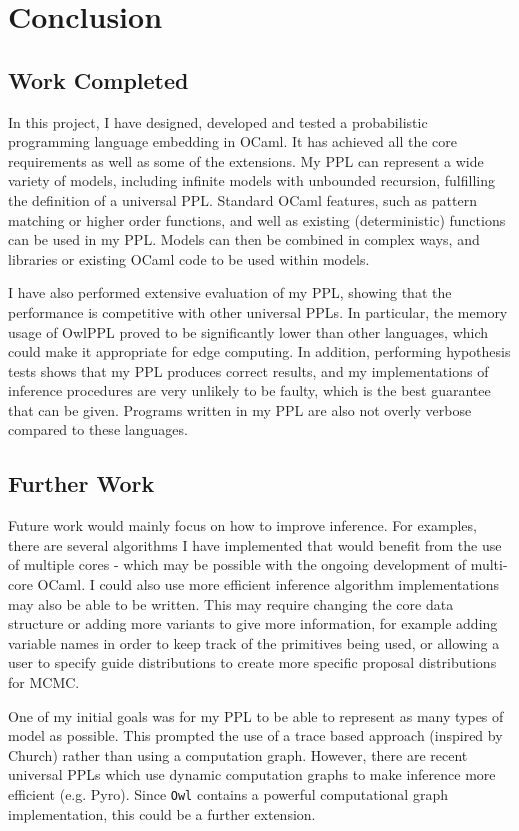 \chapter{Conclusion}

\section{Work Completed}
In this project, I have designed, developed and tested a probabilistic programming language embedding in OCaml. It has achieved all the core requirements as well as some of the extensions. My PPL can represent a wide variety of models, including infinite models with unbounded recursion, fulfilling the definition of a universal PPL. Standard OCaml features, such as pattern matching or higher order functions, and well as existing (deterministic) functions can be used in my PPL. Models can then be combined in complex ways, and libraries or existing OCaml code to be used within models.

I have also performed extensive evaluation of my PPL, showing that the performance is competitive with other universal PPLs. In particular, the memory usage of OwlPPL proved to be significantly lower than other languages, which could make it appropriate for edge computing. In addition, performing hypothesis tests shows that my PPL produces correct results, and my implementations of inference procedures are very unlikely to be faulty, which is the best guarantee that can be given. Programs written in my PPL are also not overly verbose compared to these languages.

\section{Further Work}

Future work would mainly focus on how to improve inference. For examples, there are several algorithms I have implemented that would benefit from the use of multiple cores - which may be possible with the ongoing development of multi-core OCaml. I could also use more efficient inference algorithm implementations may also be able to be written. This may require changing the core data structure or adding more variants to give more information, for example adding variable names in order to keep track of the primitives being used, or allowing a user to specify guide distributions to create more specific proposal distributions for MCMC.

One of my initial goals was for my PPL to be able to represent as many types of model as possible. This prompted the use of a trace based approach (inspired by Church) rather than using a computation graph. However, there are recent universal PPLs which use dynamic computation graphs to make inference more efficient (e.g. Pyro). Since \texttt{Owl} contains a powerful computational graph implementation, this could be a further extension.

